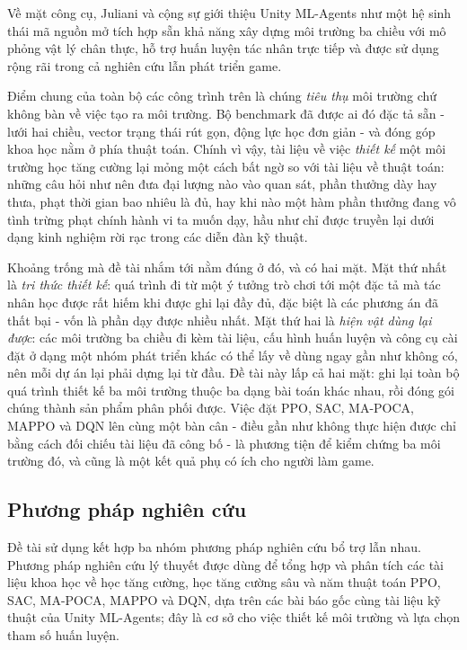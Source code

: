 \indent Về mặt công cụ, Juliani và cộng sự \cite{juliani2020unity} giới thiệu Unity
ML-Agents như một hệ sinh thái mã nguồn mở tích hợp sẵn khả năng xây dựng môi trường
ba chiều với mô phỏng vật lý chân thực, hỗ trợ huấn luyện tác nhân trực tiếp và được
sử dụng rộng rãi trong cả nghiên cứu lẫn phát triển game.

\indent Điểm chung của toàn bộ các công trình trên là chúng \textit{tiêu thụ} môi
trường chứ không bàn về việc tạo ra môi trường. Bộ benchmark đã được ai đó đặc tả sẵn -
lưới hai chiều, vector trạng thái rút gọn, động lực học đơn giản - và đóng góp khoa học
nằm ở phía thuật toán. Chính vì vậy, tài liệu về việc \textit{thiết kế} một môi trường
học tăng cường lại mỏng một cách bất ngờ so với tài liệu về thuật toán: những câu hỏi
như nên đưa đại lượng nào vào quan sát, phần thưởng dày hay thưa, phạt thời gian bao
nhiêu là đủ, hay khi nào một hàm phần thưởng đang vô tình trừng phạt chính hành vi ta
muốn dạy, hầu như chỉ được truyền lại dưới dạng kinh nghiệm rời rạc trong các diễn đàn
kỹ thuật.

\indent Khoảng trống mà đề tài nhắm tới nằm đúng ở đó, và có hai mặt. Mặt thứ nhất là
\textit{tri thức thiết kế}: quá trình đi từ một ý tưởng trò chơi tới một đặc tả mà tác
nhân học được rất hiếm khi được ghi lại đầy đủ, đặc biệt là các phương án đã thất bại -
vốn là phần dạy được nhiều nhất. Mặt thứ hai là \textit{hiện vật dùng lại được}: các
môi trường ba chiều đi kèm tài liệu, cấu hình huấn luyện và công cụ cài đặt ở dạng một
nhóm phát triển khác có thể lấy về dùng ngay gần như không có, nên mỗi dự án lại phải
dựng lại từ đầu. Đề tài này lấp cả hai mặt: ghi lại toàn bộ quá trình thiết kế ba môi
trường thuộc ba dạng bài toán khác nhau, rồi đóng gói chúng thành sản phẩm phân phối
được. Việc đặt PPO, SAC, MA-POCA, MAPPO và DQN lên cùng một bàn cân - điều gần như
không thực hiện được chỉ bằng cách đối chiếu tài liệu đã công bố - là phương tiện để
kiểm chứng ba môi trường đó, và cũng là một kết quả phụ có ích cho người làm game.

\subsection{Phương pháp nghiên cứu}
\indent Đề tài sử dụng kết hợp ba nhóm phương pháp nghiên cứu bổ trợ lẫn nhau. Phương
pháp nghiên cứu lý thuyết được dùng để tổng hợp và phân tích các tài liệu khoa học về
học tăng cường, học tăng cường sâu và năm thuật toán PPO, SAC, MA-POCA, MAPPO và DQN,
dựa trên các bài báo gốc cùng tài liệu kỹ thuật của Unity ML-Agents; đây là cơ sở cho
việc thiết kế môi trường và lựa chọn tham số huấn luyện.

